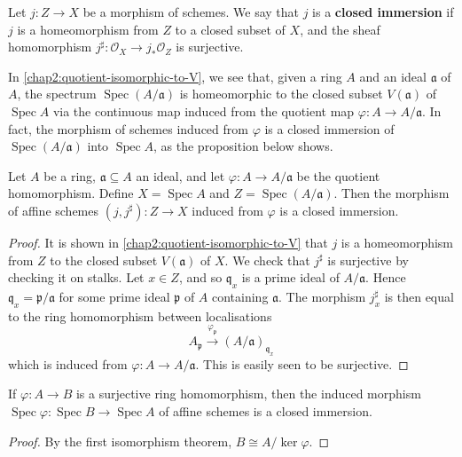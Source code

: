 \documentclass[12pt]{book}
\newcommand{\inlinedef}[1]{\textcolor{oxfordblue}{\bfseries #1}}
\theoremstyle{definition}
\DeclareMathOperator{\Spec}{Spec}
\begin{document}
	\begin{definition}
		Let $j \colon Z \to X$ be a morphism of schemes. We say that $j$ is a \inlinedef{closed immersion} if $j$ is a homeomorphism from $Z$ to a closed subset of $X$, and the sheaf homomorphism $j^\sharp \colon \mathcal{O}_X \to j_\ast\mathcal{O}_Z$ is surjective. 
	\end{definition}
	
	In \cref{chap2:quotient-isomorphic-to-V}, we see that, given a ring $A$ and an ideal $\mathfrak{a}$ of $A$, the spectrum $\Spec(A/\mathfrak{a})$ is homeomorphic to the closed subset $V(\mathfrak{a})$ of $\Spec A$ via the continuous map induced from the quotient map $\varphi \colon A \to A/\mathfrak{a}$. In fact, the morphism of schemes induced from $\varphi$ is a closed immersion of $\Spec(A/\mathfrak{a})$ into $\Spec A$, as the proposition below shows.
	
	\begin{proposition}
		Let $A$ be a ring, $\mathfrak{a} \subseteq A$ an ideal, and let $\varphi \colon A \to A/\mathfrak{a}$ be the quotient homomorphism. Define $X = \Spec A$ and $Z = \Spec (A/\mathfrak{a})$. Then the morphism of affine schemes $(j, j^\sharp) \colon Z \to X$  induced from $\varphi$ is a closed immersion.
	\end{proposition}
	\begin{proof}
		It is shown in \cref{chap2:quotient-isomorphic-to-V} that $j$ is a homeomorphism from $Z$ to the closed subset $V(\mathfrak{a})$ of $X$. We check that $j^\sharp$ is surjective by checking it on stalks. Let $x \in Z$, and so $\mathfrak{q}_x$ is a prime ideal of $A/\mathfrak{a}$. Hence $\mathfrak{q}_x = \mathfrak{p}/\mathfrak{a}$ for some prime ideal $\mathfrak{p}$ of $A$ containing $\mathfrak{a}$. The morphism $j^\sharp_x$ is then equal to the ring homomorphism between localisations
		\begin{equation*}
			A_{\mathfrak{p}} \xrightarrow{\varphi_{\mathfrak{p}}} (A/\mathfrak{a})_{\mathfrak{q}_x}
		\end{equation*}
		which is induced from $\varphi \colon A \to A/\mathfrak{a}$. This is easily seen to be surjective.
	\end{proof}
	
	\begin{corollary}\label{chap4:surjective-ring-hom-gives-closed-immersion}
		If $\varphi \colon A \to B$ is a surjective ring homomorphism, then the induced morphism $\Spec \varphi \colon \Spec B \to \Spec A$ of affine schemes is a closed immersion.
	\end{corollary}
	\begin{proof}
		By the first isomorphism theorem, $B \cong A/\ker \varphi$.
	\end{proof}
	
\end{document}
